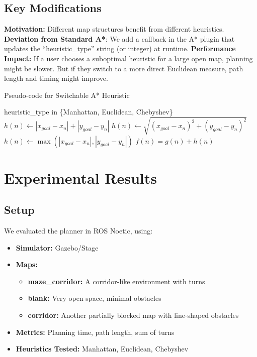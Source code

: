 \documentclass[letterpaper, 10 pt, conference]{ieeeconf}
\begin{document}
\subsection{Key Modifications}
\textbf{Motivation:} 
Different map structures benefit from different heuristics.  
\textbf{Deviation from Standard A*}: 
We add a callback in the A* plugin that updates the “heuristic\_type” string 
(or integer) at runtime.  
\textbf{Performance Impact:} 
If a user chooses a suboptimal heuristic for a large open map, planning might 
be slower. But if they switch to a more direct Euclidean measure, path length 
and timing might improve.

\begin{algorithm}[H]
\caption{Pseudo-code for Switchable A* Heuristic}
\label{alg:alg2}
\begin{algorithmic}[1]
\REQUIRE heuristic\_type in \{Manhattan, Euclidean, Chebyshev\}
    \STATE $h(n) \leftarrow |x_{goal} - x_n| + |y_{goal} - y_n|$
    \STATE $h(n) \leftarrow \sqrt{(x_{goal}-x_n)^2 + (y_{goal}-y_n)^2}$
    \STATE $h(n) \leftarrow \max(|x_{goal}-x_n|,|y_{goal}-y_n|)$
\ENDIF
\RETURN $f(n) = g(n) + h(n)$
\end{algorithmic}
\end{algorithm}


\section{Experimental Results}\label{sec:experiments}
\subsection{Setup}
We evaluated the planner in ROS Noetic, using:
\begin{itemize}
    \item \textbf{Simulator:} Gazebo/Stage
    \item \textbf{Maps:} 
        \begin{itemize}
            \item \textbf{maze\_corridor:} A corridor-like environment with turns
            \item \textbf{blank:} Very open space, minimal obstacles
            \item \textbf{corridor:} Another partially blocked map with line-shaped obstacles
        \end{itemize}
    \item \textbf{Metrics:} Planning time, path length, sum of turns
    \item \textbf{Heuristics Tested:} Manhattan, Euclidean, Chebyshev
\end{itemize}
\end{document}
